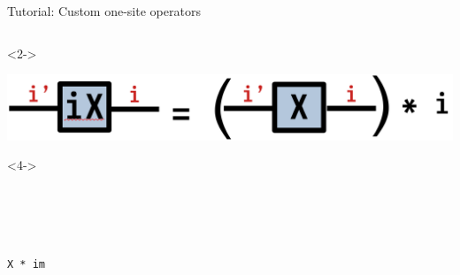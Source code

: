 \begin{frame}[fragile]{Tutorial: Custom one-site operators}
\begin{columns}
\begin{column}{4.5cm}
\begin{onlyenv}<2->
\vspace*{0.0cm}
\begin{center}
\includegraphics[width=1.0\textwidth]{
  slides/assets/iX.png
} 
\end{center}
\vspace*{0.0cm}
\end{onlyenv}

\begin{onlyenv}<4->
~\\
~\\
~\\
~\\
~\\
\begin{lstlisting}[language=JuliaLocal, style=julia, basicstyle=\scriptsize\ttfamily]
X * im
\end{lstlisting}
\end{onlyenv}

\end{column}

\end{columns}

\end{frame}
